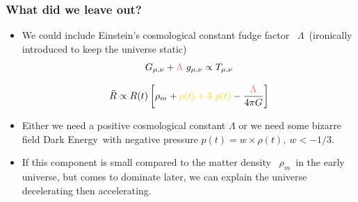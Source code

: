 \documentclass{beamer}
\newcommand{\glambda}{\mbox{{\color{brightred} $\Lambda$}}}
\newcommand{\grhom}{\mbox{{\color{gold} $\rho_m$}}}
\newcommand{\gdarkenergy}{{\color{cadetblue} Dark Energy}}
\begin{document}
\frame
{
    \frametitle{What did we leave out?}

    \begin{itemize}
        \item We could include Einstein's cosmological constant fudge factor
            \glambda\ (ironically introduced to keep the universe static)
            \begin{equation} 
                G_{\mu, \nu} + \glambda\ g_{\mu, \nu} \propto T_{\mu, \nu}
            \end{equation}

            \begin{equation}
                \ddot{R} \propto R(t) \left[\rho_m + {\color{gold} \rho(t) + 3 ~ p(t)} - \frac{\glambda}{4 \pi G}\right]
            \end{equation}

        \item Either we need a positive cosmological constant {\color{gold} $\Lambda$}
            or we need some bizarre field \gdarkenergy\ with negative pressure {\color{gold}
            $p(t) = w \times \rho(t), ~ w < -1/3$}.

        \item If this component is small compared to the matter density \grhom\
            in the early universe, but comes to dominate later, we can explain
            the universe decelerating then accelerating.

    \end{itemize}
}
\end{document}

